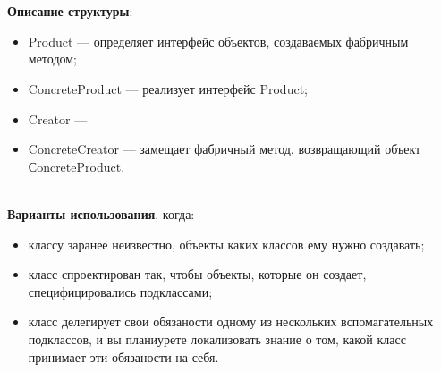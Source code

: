 \documentclass[a3paper,11pt]{report}
\def \boxSize {7cm}
\renewcommand{\unidirectionalAssociation}[4]{
	\draw [umlcd style, ->, umlcdNS] (#1) -- (#4)
	node[near end, above]{#2}
	node[near end, below]{#3};
}
\newcommand{\umlnoteND}[6]{
	\node[umlcd style, anchor=north, draw, shape=umlcdnote, text width=#2] at (#1) (note) {#3};
	\draw [umlcd style dashed line , ] (note.#4) ++(#5) --++(#6) coordinate(tmp) node[circle,inner sep=0pt,draw, fill=black!1, minimum size=5pt] (NoD) { };
}
\begin{document}
\\\\
\textbf{Описание структуры}:
\begin{itemize}
\item Product --- определяет интерфейс объектов, создаваемых фабричным методом;
\item ConcreteProduct --- реализует интерфейс Product;
\item Creator --- 
\item ConcreteCreator --- замещает фабричный метод, возвращающий объект СoncreteProduct.
\end{itemize}

\large\textbf{\\Варианты использования}, когда:
\begin{itemize}
\item классу заранее неизвестно, объекты каких классов ему нужно создавать;
\item класс спроектирован так, чтобы объекты, которые он создает, специфицировались подклассами;
\item класс делегирует свои обязаности одному из нескольких вспомагательных подклассов, и вы планиурете локализовать знание о том, какой класс принимает эти обязаности на себя.
\end{itemize}
\end{document}
